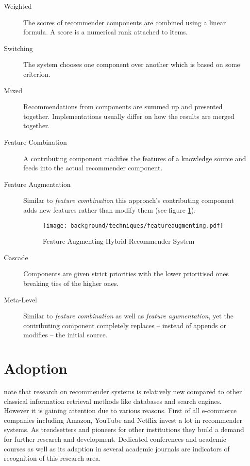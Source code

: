 \begin{description}
    \item[Weighted] The scores of recommender components are combined using a linear formula. A score is a numerical rank attached to items.
    \item[Switching] The system chooses one component over another which is based on some criterion.
    \item[Mixed] Recommendations from components are summed up and presented together. Implementations usually differ on how the results are merged together.
    \item[Feature Combination] A contributing component modifies the features of a knowledge source and feeds into the actual recommender component.
    \item[Feature Augmentation] Similar to \textit{feature combination} this approach's contributing component adds new features rather than modify them (see figure \ref{fig:featureaugmenting}).

    \begin{figure}[ht]
        \texttt{[image: background/techniques/featureaugmenting.pdf]}
        \caption{Feature Augmenting Hybrid Recommender System}
        \label{fig:featureaugmenting}
    \end{figure}

    \item[Cascade] Components are given strict priorities with the lower prioritised ones breaking ties of the higher ones.
    \item[Meta-Level] Similar to \textit{feature combination} as well as \textit{feature agumentation}, yet the contributing component completely replaces -- instead of appends or modifies -- the initial source.
\end{description}

\section{Adoption}

\citet{ricci11} note that research on recommender systems is relatively new compared to other classical information retrieval methods like databases and search engines. However it is gaining attention due to various reasons. First of all e-commerce companies including Amazon, YouTube and Netflix invest a lot in recommender systems. As trendsetters and pioneers for other institutions they build a demand for further research and development. Dedicated conferences and academic courses as well as its adaption in several academic journals are indicators of recognition of this research area.

